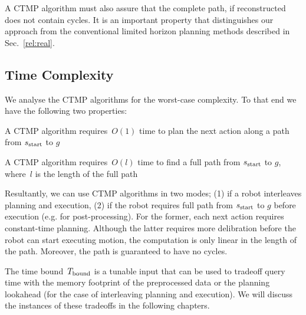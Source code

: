 \documentclass[a4paper]{report}
\begin{document}

A CTMP algorithm must also assure that the complete path, if reconstructed does not contain cycles. It is an important property that distinguishes our approach from the conventional limited horizon planning methods described in Sec.~\ref{rel:real}.

\subsection{Time Complexity}
We analyse the CTMP algorithms for the worst-case complexity. To that end we have the following two properties:

\vspace{2mm}
\begin{property}
\label{ctmp:prop1}
A CTMP algorithm requires~$O(1)$ time to plan the next action along a path from $s_{\text{start}}$ to $g$
\end{property}

\vspace{2mm}
\begin{property}
\label{ctmp:prop2}
A CTMP algorithm requires~$O(l)$ time to find a full path from $s_{\text{start}}$ to $g$, where~$l$ is the length of the full path
\end{property}

Resultantly, we can use CTMP algorithms in two modes; (1) if a robot interleaves planning and execution, (2) if the robot requires full path from $s_{\text{start}}$ to $g$ before execution (e.g. for post-processing). For the former, each next action requires constant-time planning. Although the latter requires more delibration before the robot can start executing motion, the computation is only linear in the length of the path. Moreover, the path is guaranteed to have no cycles.

The time bound~$T_{\textrm{bound}}$ is a tunable input that can be used to tradeoff query time with the memory footprint of the preprocessed data or the planning lookahead (for the case of interleaving planning and execution). We will discuss the instances of these tradeoffs in the following chapters.
%
\end{document}
